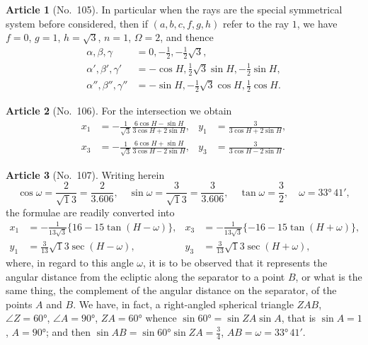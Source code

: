\documentclass[11pt,a4paper]{article}
\theoremstyle{definition}
\newtheorem{art}{Article}
\begin{document}
\begin{art}[No.~105]
In particular when the rays are the special symmetrical system before considered, then if $(a, b, c, f, g, h)$ refer to the ray $1$, we have $f = 0$, $g = 1$, $h = \surd 3$, $n = 1$, $\Omega = 2$, and thence
\begin{align*}
\alpha, \beta, \gamma &= 0, -\tfrac{1}{2}, -\tfrac{1}{2}\surd 3,\\
\alpha', \beta', \gamma' &= -\cos H, \tfrac{1}{2}\surd 3\sin H, -\tfrac{1}{2}\sin H,\\
\alpha'', \beta'', \gamma'' &= -\sin H, -\tfrac{1}{2}\surd 3\cos H, \tfrac{1}{2}\cos H.
\end{align*}
\end{art}


\begin{art}[No.~106]
For the intersection we obtain
\begin{align*}
x_1 &= -\frac{1}{\surd 3}\frac{6\cos H - \sin H}{3\cos H + 2\sin H}, &
y_1 &= \frac{3}{3\cos H + 2\sin H},\\
x_3 &= -\frac{1}{\surd 3}\frac{6\cos H + \sin H}{3\cos H - 2\sin H}, &
y_3 &= \frac{3}{3\cos H - 2\sin H}.
\end{align*}
\end{art}

\begin{art}[No.~107]
Writing herein
\[
\cos\omega = \frac{2}{\surd 13} = \frac{2}{3.606}, \quad \sin\omega = \frac{3}{\surd 13} = \frac{3}{3.606}, \quad \tan\omega = \frac{3}{2}, \quad \omega = 33°\, 41',
\]
the formulae are readily converted into
\begin{align*}
x_1 &= -\frac{1}{13\surd 3}\{16 - 15\tan(H - \omega)\}, &
x_3 &= -\frac{1}{13\surd 3}\{-16 - 15\tan(H + \omega)\},\\
y_1 &= \frac{3}{13}\surd 13 \sec(H - \omega), &
y_3 &= \frac{3}{13}\surd 13 \sec(H + \omega),
\end{align*}
where, in regard to this angle $\omega$, it is to be observed that it represents the angular distance from the ecliptic along the separator to a point $B$, or what is the same thing, the complement of the angular distance on the separator, of the points $A$ and $B$. We have, in fact, a right-angled spherical triangle $ZAB$, $\angle Z = 60°$, $\angle A = 90°$, $ZA = 60°$ whence $\sin 60° = \sin ZA \sin A$, that is $\sin A = 1$, $A = 90°$; and then $\sin AB = \sin 60° \sin ZA = \frac{3}{4}$, $AB = \omega = 33°\, 41'$.
\end{art}
\end{document}
